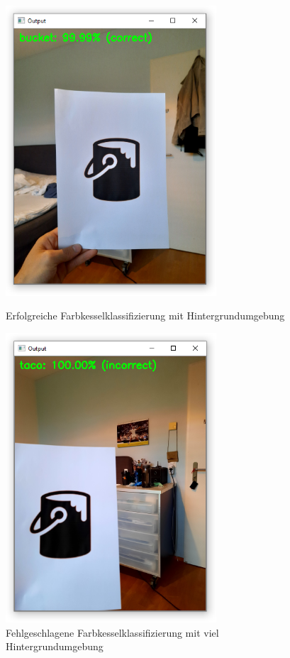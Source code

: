 \begin{figure}[H]
  \centering
  \begin{minipage}[t]{0.45\linewidth}
  \includegraphics[width=0.7\textwidth]{img/piktogrammerkennung/classifiedBucketBG.PNG}
  \caption{Erfolgreiche Farbkesselklassifizierung mit Hintergrundumgebung}
  \label{fig:erfolgreiche-klassifikation-mit-cnn-2}
  \end{minipage} 
  \hfill
  \begin{minipage}[t]{0.45\linewidth}
  \includegraphics[width=0.7\textwidth]{img/piktogrammerkennung/notClassifiedBucketBG.PNG}
  \caption{Fehlgeschlagene Farbkesselklassifizierung mit viel Hintergrundumgebung}
  \label{fig:fehlerhafte-klassifikation-mit-cnn-1}
  \end{minipage}
\end{figure}

